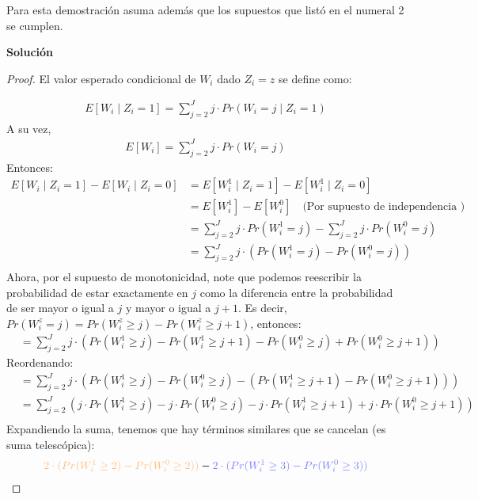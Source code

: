 \documentclass[a4paper, answers, addpoints, 11pt]{exam}
\newenvironment{solucion}{%
  \begin{mdframed}[
    backgroundcolor=blue!5,    %
    linecolor=blue!50,          %
    linewidth=2pt,              %
    leftmargin=10pt,            %
    rightmargin=8pt,           %
    topline=true,              %
    bottomline=true,            %
    roundcorner=10pt,           %
    innerleftmargin=10pt,       %
    innerrightmargin=10pt,      %
    innerbottommargin=10pt,     %
    innertopmargin=10pt         %
  ]%
  \begin{tcolorbox}[colframe=blue!50!black, colback=blue!50, coltitle=white, sharp corners=all, boxrule=1mm, width=\textwidth, halign=left, valign=center, top=0mm, bottom=0mm, left=0mm, right=0mm] \textbf{Solución} \end{tcolorbox} }{\end{mdframed}}
\begin{document}
\begin{enumerate}
\begin{enumerate}
            Para esta demostración asuma además que los supuestos que listó en el numeral 2 se cumplen. 

          \begin{solucion}
\begin{proof}
El valor esperado condicional de $W_i$ dado $Z_i = z$ se define como:

\begin{align*}
    E[W_i \mid Z_i = 1] = \sum_{j=2}^{J} j \cdot Pr(W_i = j \mid Z_i = 1)
\end{align*}
A su vez,
\begin{align*}
    E[W_i] = \sum_{j=2}^{J} j \cdot Pr(W_i = j )
\end{align*}
Entonces:
          \begin{align*}
    E[W_i \mid Z_i = 1] - E[W_i \mid Z_i = 0] &= E[W_i^1 \mid Z_i = 1] - E[W_i^1 \mid Z_i = 0]\\&= E[W_i^1 ] - E[W_i^0] \quad  \text{(Por supuesto de independencia )}\\
    &=\sum_{j=2}^{J} j \cdot Pr(W_i^1 = j ) - \sum_{j=2}^{J} j \cdot Pr(W_i^0 = j ) \\
    &= \sum_{j=2}^{J} j \cdot \left( Pr(W_i^1 = j ) - Pr(W_i^0 = j ) \right)  \\  
    \end{align*}
Ahora, por el supuesto de monotonicidad, note que podemos reescribir la probabilidad de estar exactamente en $j$ como la diferencia entre la probabilidad de ser mayor o igual a $j$ y mayor o igual a $j+1$. Es decir, $Pr(W_i^z = j )= Pr(W_i^z \geq j)-Pr(W_i^z \geq j+1)$, entonces:
    \begin{align*}
    &=\sum_{j=2}^{J} j \cdot(  Pr(W_i^1 \geq j) - Pr(W_i^1 \geq j+1) -   Pr(W_i^0 \geq j)  +   Pr(W_i^0 \geq j+1)) 
    \end{align*}
    Reordenando:
    \begin{align*}
&= \sum_{j=2}^{J} j \cdot \left( Pr(W_i^1 \geq j) - Pr(W_i^0 \geq j) - (Pr(W_i^1 \geq j+1) - Pr(W_i^0 \geq j+1)) \right) \\
&= \sum_{j=2}^{J} \left( j \cdot Pr(W_i^1 \geq j) - j \cdot Pr(W_i^0 \geq j) - j \cdot Pr(W_i^1 \geq j+1) + j \cdot Pr(W_i^0 \geq j+1) \right) \\
\end{align*}
Expandiendo la suma, tenemos que hay términos similares que se cancelan (es suma telescópica):
\begin{align*} 
&\textcolor{orange!50}{2 \cdot (Pr(W_i^1 \geq 2) - Pr(W_i^0 \geq 2))} - \textcolor{blue!50}{2 \cdot (Pr(W_i^1 \geq 3) - Pr(W_i^0 \geq 3))} \\

\end{align*}
\end{proof}
\end{solucion}
\end{enumerate}
\end{enumerate}
\end{document}
